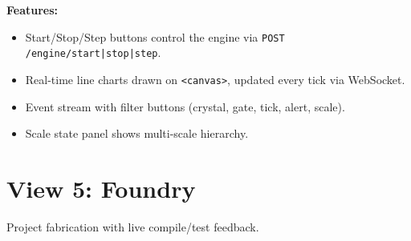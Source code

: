 \documentclass[11pt,a4paper,twoside]{article}
\begin{document}
\textbf{Features:}
\begin{itemize}[nosep]
  \item Start/Stop/Step buttons control the engine via
        \texttt{POST /engine/start|stop|step}.
  \item Real-time line charts drawn on \texttt{<canvas>}, updated
        every tick via WebSocket.
  \item Event stream with filter buttons (crystal, gate, tick,
        alert, scale).
  \item Scale state panel shows multi-scale hierarchy.
\end{itemize}


\section{View 5: Foundry}\label{sec:foundry}

Project fabrication with live compile/test feedback.
\end{document}

